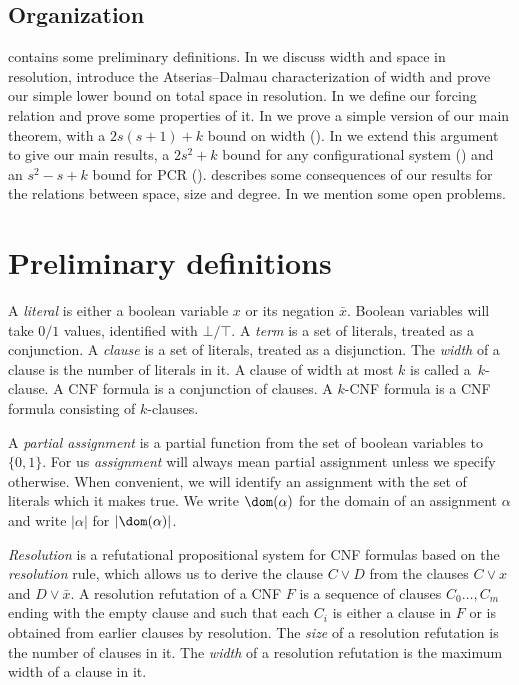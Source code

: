 \subsection{Organization}

 contains some preliminary definitions.
In  we discuss width and space in resolution,
introduce the Atserias--Dalmau characterization of width
and prove our simple lower bound on total space in resolution.
In  we define our forcing relation
and prove some properties of it.
In  we prove a simple version
of our main theorem, with a $2s(s+1)+k$ bound on width ().
In  we extend this argument to 
give our main results, a $2s^2+k$ bound for any configurational system
()
and an $s^2-s+k$ bound for PCR ().
 describes some consequences of our
results for the relations between space, size and degree.
In  we mention some open problems.


%
\section{Preliminary definitions}\label{sec:definitions}
%

A \emph{literal} is either a boolean variable $x$ or its negation $\bar x$.
Boolean variables will take $0/1$ values,  
identified with $\bot/ \top$. 
A \emph{term} is a set of literals, treated as a conjunction.
A \emph{clause} is a set of literals, treated as a disjunction. 
The \emph{width} of a clause is the number of literals in it.  A clause of width 
at most $k$ is called a~$k$-clause. A CNF formula  is a conjunction of clauses. A $k$-CNF formula is a CNF formula consisting of $k$-clauses.


A \emph{partial assignment} is a partial function from the set of boolean
variables to $\{0,1\}$. 
For us \emph{assignment} will always mean partial assignment unless we specify otherwise.
When convenient, we will identify an assignment with the set of literals which it makes true.
We write $\dom(\alpha)$ for the domain  of an assignment $\alpha$
and write $|\alpha|$ for $|\dom(\alpha)|$.



\emph{Resolution}
 is a refutational propositional system for CNF formulas based on the 
 \emph{resolution} rule, 
 which allows us to derive the clause $C \vee D$ from the clauses
 $C \vee x$ and $D \vee \bar x$.
A resolution refutation of a CNF $F$ is a sequence of clauses $C_0 \ldots, C_m$ ending with the empty clause 
and such that each $C_i$ is either a clause in $F$ or is obtained from earlier clauses  by 
resolution. 
The \emph{size} of a resolution refutation is the number of clauses in it. The \emph{width} of a resolution refutation is the maximum width
of a clause in it.
 
